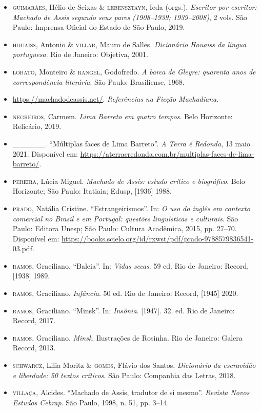 \begin{itemize}
\item \textsc{guimarães}, Hélio de Seixas \& \textsc{lebensztayn}, Ieda (orgs.). \emph{Escritor
por escritor: Machado de Assis segundo seus pares (1908--1939;
1939--2008)}, 2 vols. São Paulo: Imprensa Oficial do Estado de São Paulo,
2019.

\item \textsc{houaiss}, Antonio \& \textsc{villar}, Mauro de Salles. \emph{Dicionário Houaiss da
língua portuguesa}. Rio de Janeiro: Objetiva, 2001.

\item \textsc{lobato}, Monteiro \& \textsc{rangel}, Godofredo. \emph{A barca de Gleyre: quarenta
anos de correspondência literária}. São Paulo: Brasiliense, 1968.

\item\url{https://machadodeassis.net/}. \emph{Referências na Ficção
Machadiana}.

\item \textsc{negreiros}, Carmem. \emph{Lima Barreto em quatro tempos}. Belo Horizonte:
Relicário, 2019.

\item \_\_\_\_\_\_. ``Múltiplas faces de Lima Barreto''. \emph{A Terra é
Redonda}, 13 maio 2021. Disponível em:
\url{https://aterraeredonda.com.br/multiplas-faces-de-lima-barreto/}.

\item \textsc{pereira}, Lúcia Miguel. \emph{Machado de Assis: estudo crítico e
biográfico}. Belo Horizonte; São Paulo: Itatiaia; Edusp, {[}1936{]}
1988.

\item \textsc{prado}, Natália Cristine. ``Estrangeirismos''. In: \emph{O uso do inglês
em contexto comercial no Brasil e em Portugal: questões linguísticas e
culturais}. São Paulo: Editora Unesp; São Paulo: Cultura Acadêmica,
2015, pp. 27--70. Disponível em:
\url{https://books.scielo.org/id/rxwst/pdf/prado-9788579836541-03.pdf}.

\item \textsc{ramos}, Graciliano. ``Baleia''. In: \emph{Vidas secas}. 59 ed. Rio de
Janeiro: Record, {[}1938{]} 1989.

\item \textsc{ramos}, Graciliano. \emph{Infância}. 50 ed. Rio de Janeiro: Record,
{[}1945{]} 2020.

\item \textsc{ramos}, Graciliano. ``Minsk''. In: \emph{Insônia}. {[}1947{]}. 32. ed.
Rio de Janeiro: Record, 2017.

\item \textsc{ramos}, Graciliano. \emph{Minsk}. Ilustrações de Rosinha. Rio de Janeiro:
Galera Record, 2013.

\item \textsc{schwarcz}, Lilia Moritz \& \textsc{gomes}, Flávio dos Santos. \emph{Dicionário da
escravidão e liberdade: 50 textos críticos}. São Paulo: Companhia das
Letras, 2018.

\item \textsc{villaça}, Alcides. ``Machado de Assis, tradutor de si mesmo''.
\emph{Revista Novos Estudos Cebrap}. São Paulo, 1998, n. 51, pp. 3--14.
\end{itemize}

